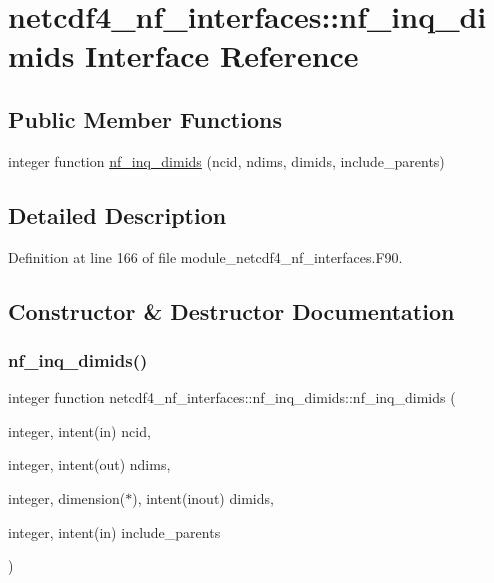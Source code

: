 \hypertarget{interfacenetcdf4__nf__interfaces_1_1nf__inq__dimids}{}\section{netcdf4\+\_\+nf\+\_\+interfaces\+:\+:nf\+\_\+inq\+\_\+dimids Interface Reference}
\label{interfacenetcdf4__nf__interfaces_1_1nf__inq__dimids}
\subsection*{Public Member Functions}
\begin{DoxyCompactItemize}
\item 
integer function \hyperlink{interfacenetcdf4__nf__interfaces_1_1nf__inq__dimids_aa5b437161b9301ce1636a259dd935620}{nf\+\_\+inq\+\_\+dimids} (ncid, ndims, dimids, include\+\_\+parents)
\end{DoxyCompactItemize}


\subsection{Detailed Description}


Definition at line 166 of file module\+\_\+netcdf4\+\_\+nf\+\_\+interfaces.\+F90.



\subsection{Constructor \& Destructor Documentation}
\mbox{\label{interfacenetcdf4__nf__interfaces_1_1nf__inq__dimids_aa5b437161b9301ce1636a259dd935620}} 
\subsubsection{\texorpdfstring{nf\+\_\+inq\+\_\+dimids()}{nf\_inq\_dimids()}}
{\footnotesize\ttfamily integer function netcdf4\+\_\+nf\+\_\+interfaces\+::nf\+\_\+inq\+\_\+dimids\+::nf\+\_\+inq\+\_\+dimids (\begin{DoxyParamCaption}\item[{integer, intent(in)}]{ncid,  }\item[{integer, intent(out)}]{ndims,  }\item[{integer, dimension($\ast$), intent(inout)}]{dimids,  }\item[{integer, intent(in)}]{include\+\_\+parents }\end{DoxyParamCaption})}



